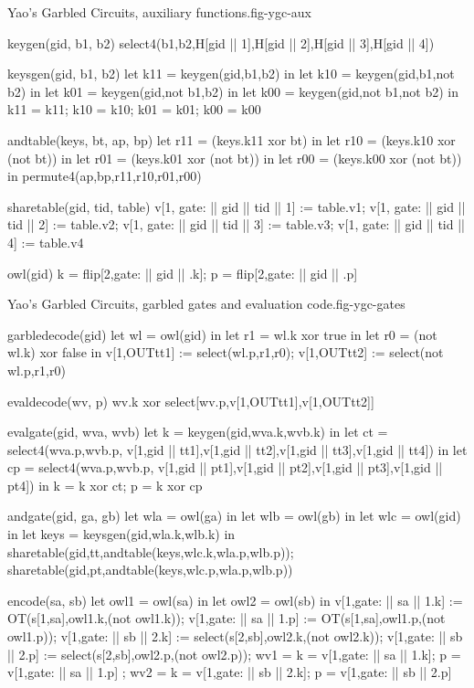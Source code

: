 \begin{fpfig}[t]{Yao's Garbled Circuits, auxiliary functions.}{fig-ygc-aux}
{\footnotesize
\begin{verbatimtab}
  keygen(gid, b1, b2) { select4(b1,b2,H[gid || 1],H[gid || 2],H[gid || 3],H[gid || 4]) }
  
  keysgen(gid, b1, b2)
  {
    let k11 = keygen(gid,b1,b2) in
    let k10 = keygen(gid,b1,not b2) in
    let k01 = keygen(gid,not b1,b2) in
    let k00 = keygen(gid,not b1,not b2) in
    {k11 = k11; k10 = k10; k01 = k01; k00 = k00}
  }
  
  andtable(keys, bt, ap, bp)
  {
    let r11 = (keys.k11 xor bt) in 
    let r10 = (keys.k10 xor (not bt)) in
    let r01 = (keys.k01 xor (not bt)) in
    let r00 = (keys.k00 xor (not bt)) in
    permute4(ap,bp,r11,r10,r01,r00)
  }
  
  sharetable(gid, tid, table)
  {   
    v[1, gate: || gid || tid || 1] := table.v1;
    v[1, gate: || gid || tid || 2] := table.v2;
    v[1, gate: || gid || tid || 3] := table.v3;
    v[1, gate: || gid || tid || 4] := table.v4
  }

  owl(gid) {  { k = flip[2,gate: || gid || .k]; p = flip[2,gate: || gid || .p] }  }
\end{verbatimtab}
}
\end{fpfig}

\begin{fpfig}[t]{Yao's Garbled Circuits, garbled gates and evaluation code.}{fig-ygc-gates}
{\footnotesize
\begin{verbatimtab}
  garbledecode(gid)
  {
    let wl = owl(gid) in
    let r1 = wl.k xor true in
    let r0 = (not wl.k) xor false in
    v[1,OUTtt1] := select(wl.p,r1,r0);
    v[1,OUTtt2] := select(not wl.p,r1,r0)
  }
  
  evaldecode(wv, p) { wv.k xor select[wv.p,v[1,OUTtt1],v[1,OUTtt2]] }
  
  evalgate(gid, wva, wvb)
  {
    let k = keygen(gid,wva.k,wvb.k) in
    let ct = select4(wva.p,wvb.p,
               v[1,gid || tt1],v[1,gid || tt2],v[1,gid || tt3],v[1,gid || tt4]) in
    let cp = select4(wva.p,wvb.p,
               v[1,gid || pt1],v[1,gid || pt2],v[1,gid || pt3],v[1,gid || pt4]) in
    { k = k xor ct; p = k xor cp }
  }
  
  andgate(gid, ga, gb) 
  {
    let wla = owl(ga) in
    let wlb = owl(gb) in
    let wlc = owl(gid) in
    let keys = keysgen(gid,wla.k,wlb.k) in
    sharetable(gid,tt,andtable(keys,wlc.k,wla.p,wlb.p));
    sharetable(gid,pt,andtable(keys,wlc.p,wla.p,wlb.p))
  }

  encode(sa, sb)
  {
    let owl1 = owl(sa) in
    let owl2 = owl(sb) in
    v[1,gate: || sa || 1.k] := OT(s[1,sa],owl1.k,(not owl1.k));
    v[1,gate: || sa || 1.p] := OT(s[1,sa],owl1.p,(not owl1.p));
    v[1,gate: || sb || 2.k] := select(s[2,sb],owl2.k,(not owl2.k));
    v[1,gate: || sb || 2.p] := select(s[2,sb],owl2.p,(not owl2.p));
    { wv1 = { k = v[1,gate: || sa || 1.k]; p = v[1,gate: || sa || 1.p] };
      wv2 = { k = v[1,gate: || sb || 2.k]; p = v[1,gate: || sb || 2.p] } }
  }
\end{verbatimtab}
}
\end{fpfig}


